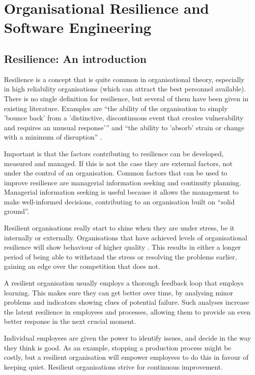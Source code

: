 \chapter{Organisational Resilience and Software Engineering}
\section{Resilience: An introduction}
Resilience is a concept that is quite common in organisational theory, especially in high reliability organisations (which can attract the best personnel available).
There is no single definition for resilience, but several of them have been given in existing literature.
Examples are ``the ability of the organisation to simply 'bounce back' from a 'distinctive, discontinuous event that creates vulnerability and requires an unusual response'{''} \cite{JCCM:JCCM558} and ``the ability to 'absorb' strain or change with a minimum of disruption'' \cite{JCCM:JCCM558}.

Important is that the factors contributing to resilience can be developed, measured and managed.
If this is not the case they are external factors, not under the control of an organisation. 
Common factors that can be used to improve resilience are managerial information seeking and continuity planning.
Managerial information seeking is useful because it allows the management to make well-informed decisions, contributing to an organisation built on ``solid ground''.

Resilient organisations really start to shine when they are under stress, be it internally or externally. 
Organisations that have achieved levels of organisational resilience will show behaviour of higher quality \cite{vogus2007organizational}.
This results in either a longer period of being able to withstand the stress or resolving the problems earlier, gaining an edge over the competition that does not.

A resilient organisation usually employs a thorough feedback loop \cite{vogus2007organizational} that employs learning.
This makes sure they can get better over time, by analysing minor problems and indicators showing clues of potential failure. 
Such analyses increase the latent resilience in employees and processes, allowing them to provide an even better response in the next crucial moment.

Individual employees are given the power to identify issues, and decide in the way they think is good. 
As an example, stopping a production process might be costly, but a resilient organisation will empower employees to do this in favour of keeping quiet.
Resilient organisations strive for continuous improvement.

